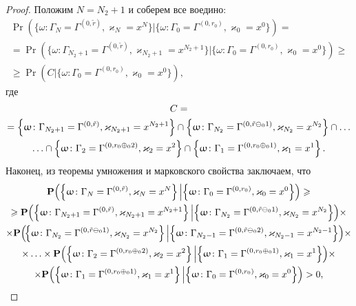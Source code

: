 \begin{proof}
Положим $N = N_2+1$ и соберем все воедино:
\begin{multline*}
\Pr(\{\omega\colon\Gamma_{N}=\Gamma^{(0,  \tilde{r} )},  \varkappa_{N}=x^N\}| \{\omega\colon
\Gamma_{0}=\Gamma^{(0,  r_0)},  \varkappa_{0}=x^0\}) = \\ =
\Pr(\{\omega\colon\Gamma_{N_2+1}=\Gamma^{(0,  \tilde{r} )},  \varkappa_{ N_2+1}=x^{N_2+1}\}|\{\omega\colon
\Gamma_{0}=\Gamma^{(0,  r_0)},  \varkappa_{0}=x^0\}) \geqslant \\ 
\geqslant
\Pr(C|\{\omega\colon\Gamma_{0}=\Gamma^{(0,  r_0)},  \varkappa_{0}=x^0\}), 
\end{multline*}
где 
\begin{multline*}
    C =\\= \left\{\omega\colon\Gamma_{ N_2+1}=\Gamma^{(0,  \tilde{r} )},  \varkappa_{ N_2+1}=x^{N_2+1}\right\} \cap \left\{ \omega\colon \Gamma_{ N_2}=\Gamma^{(0,  \tilde{r} \ominus_0 1 )},  \varkappa_{N_2}=x^{N_2}\right\} \cap\ldots \Bigr.\\ \Bigl.
\ldots \cap \left\{\omega\colon\Gamma_{2}=\Gamma^{(0,  r_0\oplus_{0}2)}, \varkappa_{2}=x^2\right\} \cap \left\{\omega\colon \Gamma_{1}=\Gamma^{(0,  r_0\oplus_{0}1)}, \varkappa_{1}=x^1\right\}.
\end{multline*}
Наконец,  из теоремы умножения и марковского свойства заключаем,  что 
\begin{multline*}
\Pr\Bigl(\Bigl\{\omega\colon \Gamma_{N}=\Gamma^{(0, \tilde{r} )},  \varkappa_{N}=x^N\Bigr\} \,  \Big|\Bigl\{\omega\colon 
\Gamma_{0}=\Gamma^{(0,  r_0)},  \varkappa_{0}=x^0\Bigr\}\Bigr) \geqslant \\ 
\geqslant
\Pr\Bigl(\Bigl\{\omega\colon \Gamma_{N_2+1}=\Gamma^{(0,  \tilde{r} )},  \varkappa_{ N_2+1}=x^{N_2+1}\Bigr\}\,  \Big| \Bigl\{\omega\colon \Gamma_{ N_2}=\Gamma^{(0,  \tilde{r} \ominus_0 1 )},  \varkappa_{N_2}=x^{N_2}\Bigr\}\Bigr) \times 
%
\\ \times
\Pr\Bigl(\!\Bigl\{\omega\colon\Gamma_{ N_2}=\Gamma^{(0,  \tilde{r} \ominus_0 1 )},  \varkappa_{N_2}=x^{N_2}\Bigr\} \, \Big| \Bigl\{\omega\colon \Gamma_{ N_2-1}=\Gamma^{(0, \tilde{r} \ominus_0 2 )},  \varkappa_{N_2-1}=x^{N_2-1}\Bigr\}\Bigr) \times 
%
\\ \times \ldots
\times 
\Pr\Bigl(\Bigl\{\omega\colon\Gamma_{2}=\Gamma^{(0,  r_0\oplus_{0}2)}, \varkappa_{2}=x^2\Bigr\}\,  \Big|  \Bigl\{\omega\colon \Gamma_{1}=\Gamma^{(0,  r_0\oplus_{0}1)},  \varkappa_{1}=x^1\Bigr\}\Bigr) \times 
\\
\times
\Pr\Bigl(\Bigl\{\omega\colon\Gamma_{1}=\Gamma^{(0,  r_0\oplus_{0}1)},  \varkappa_{1}=x^1\Bigr\} \, \Big| \Bigl\{\omega\colon \Gamma_{0}=\Gamma^{(0,  r_0)},  \varkappa_{0}=x^0\Bigr\}\Bigr)>0, 

\end{multline*}
\end{proof}
